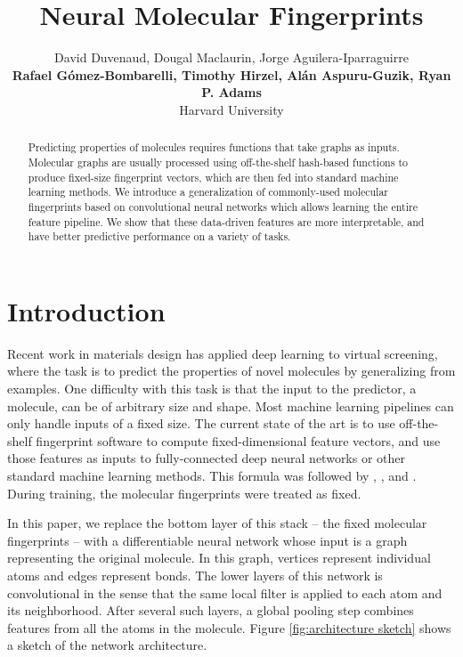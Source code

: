 \documentclass{article}
\title{Neural Molecular Fingerprints}
\author{
David Duvenaud, Dougal Maclaurin, Jorge Aguilera-Iparraguirre \\ {\bf Rafael G\'omez-Bombarelli, Timothy Hirzel, Al\'an Aspuru-Guzik, Ryan P. Adams}\\
Harvard University}
\begin{document}
\maketitle

\begin{abstract}
Predicting properties of molecules requires functions that take graphs as inputs.
Molecular graphs are usually processed using off-the-shelf hash-based functions to produce fixed-size fingerprint vectors, which are then fed into standard machine learning methods.
We introduce a generalization of commonly-used molecular fingerprints based on convolutional neural networks which allows learning the entire feature pipeline.
We show that these data-driven features are more interpretable, and have better predictive performance on a variety of tasks.
\end{abstract}

\section{Introduction}
Recent work in materials design has applied deep learning to virtual screening, where the task is to predict the properties of novel molecules by generalizing from examples.
One difficulty with this task is that the input to the predictor, a molecule, can be of arbitrary size and shape.
Most machine learning pipelines can only handle inputs of a fixed size.
The current state of the art is to use off-the-shelf fingerprint software to compute fixed-dimensional feature vectors, and use those features as inputs to fully-connected deep neural networks or other standard machine learning methods.
This formula was followed by \citet{unterthinerdeep}, \citet{dahl2014multi}, and \citet{ramsundar2015massively}.
During training, the molecular fingerprints were treated as fixed.

In this paper, we replace the bottom layer of this stack -- the fixed molecular fingerprints -- with a differentiable neural network whose input is a graph representing the original molecule.
In this graph, vertices represent individual atoms and edges represent bonds.
The lower layers of this network is convolutional in the sense that the same local filter is applied to each atom and its neighborhood.
After several such layers, a global pooling step combines features from all the atoms in the molecule.
Figure \ref{fig:architecture sketch} shows a sketch of the network architecture.
\end{document}
